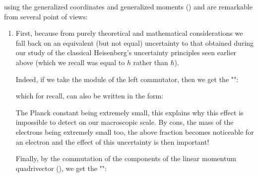 	using the generalized coordinates and generalized moments () and are remarkable from several point of views:
	\begin{enumerate}
		\item First, because from purely theoretical and mathematical considerations we fall back  on an equivalent (but not equal) uncertainty to that obtained during our study of the classical Heisenberg's uncertainty principles seen earlier above (which we recall was equal to $h$ rather than $\hbar$).

		Indeed, if we take the module of the left commutator, then we get the "":
		
		which for recall, can also be written in the form:
		
		The Planck constant being extremely small, this explains why this effect is impossible to detect on our macroscopic scale. By cons, the mass of the electrons being extremely small too, the above fraction becomes noticeable for an electron and the effect of this uncertainty is then important!
		
		Finally, by the commutation of the components of the linear momentum quadrivector (), we get the "":
		

\end{enumerate}
